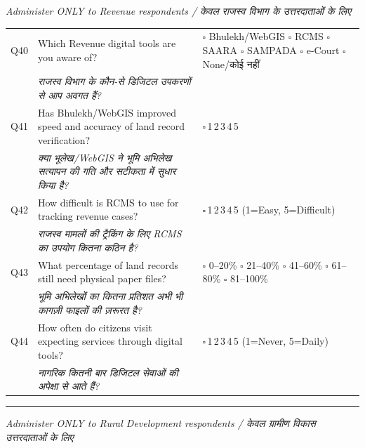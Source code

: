 \documentclass[10pt,a4paper]{article}
\newcommand{\likert}{{\Large$\square$}\,1\quad{\Large$\square$}\,2\quad{\Large$\square$}\,3\quad{\Large$\square$}\,4\quad{\Large$\square$}\,5}
\begin{document}
\small\textit{Administer ONLY to Revenue respondents / {\hindifont केवल राजस्व विभाग के उत्तरदाताओं के लिए}}\vspace{3pt}

\noindent\begin{tabularx}{\textwidth}{@{}L{0.8cm} X L{5.2cm}@{}}
Q40 & Which Revenue digital tools are you aware of? & {\Large$\square$} Bhulekh/WebGIS {\Large$\square$} RCMS {\Large$\square$} SAARA {\Large$\square$} SAMPADA {\Large$\square$} e-Court {\Large$\square$} None/{\hindifont कोई नहीं} \\
 & {\hindifont\small\itshape\color{black!70} राजस्व विभाग के कौन-से डिजिटल उपकरणों से आप अवगत हैं?} & \\[3pt]
Q41 & Has Bhulekh/WebGIS improved speed and accuracy of land record verification? & \likert \\
 & {\hindifont\small\itshape\color{black!70} क्या भूलेख/WebGIS ने भूमि अभिलेख सत्यापन की गति और सटीकता में सुधार किया है?} & \\[3pt]
Q42 & How difficult is RCMS to use for tracking revenue cases? & \likert{} {\scriptsize(1=Easy, 5=Difficult)} \\
 & {\hindifont\small\itshape\color{black!70} राजस्व मामलों की ट्रैकिंग के लिए RCMS का उपयोग कितना कठिन है?} & \\[3pt]
Q43 & What percentage of land records still need physical paper files? & {\Large$\square$} 0--20\% {\Large$\square$} 21--40\% {\Large$\square$} 41--60\% {\Large$\square$} 61--80\% {\Large$\square$} 81--100\% \\
 & {\hindifont\small\itshape\color{black!70} भूमि अभिलेखों का कितना प्रतिशत अभी भी कागज़ी फाइलों की ज़रूरत है?} & \\[3pt]
Q44 & How often do citizens visit expecting services through digital tools? & \likert{} {\scriptsize(1=Never, 5=Daily)} \\
 & {\hindifont\small\itshape\color{black!70} नागरिक कितनी बार डिजिटल सेवाओं की अपेक्षा से आते हैं?} & \\[3pt]
\end{tabularx}
\vspace{3pt}
\noindent\rule{\textwidth}{0.3pt}\vspace{3pt}
\vspace{3pt}

\small\textit{Administer ONLY to Rural Development respondents / {\hindifont केवल ग्रामीण विकास उत्तरदाताओं के लिए}}\vspace{3pt}
\end{document}
